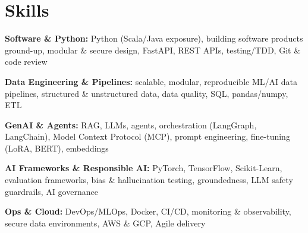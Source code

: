 \documentclass[10pt,a4paper]{article}
\begin{document}
\section{Skills}
\begin{tight}
  \item[\textcolor{accent}{\small$\bullet$}] \textbf{Software \& Python:} Python (Scala/Java exposure), building software products ground-up, modular \& secure design, FastAPI, REST APIs, testing/TDD, Git \& code review
  \item[\textcolor{accent}{\small$\bullet$}] \textbf{Data Engineering \& Pipelines:} scalable, modular, reproducible ML/AI data pipelines, structured \& unstructured data, data quality, SQL, pandas/numpy, ETL
  \item[\textcolor{accent}{\small$\bullet$}] \textbf{GenAI \& Agents:} RAG, LLMs, agents, orchestration (LangGraph, LangChain), Model Context Protocol (MCP), prompt engineering, fine-tuning (LoRA, BERT), embeddings
  \item[\textcolor{accent}{\small$\bullet$}] \textbf{AI Frameworks \& Responsible AI:} PyTorch, TensorFlow, Scikit-Learn, evaluation frameworks, bias \& hallucination testing, groundedness, LLM safety guardrails, AI governance
  \item[\textcolor{accent}{\small$\bullet$}] \textbf{Ops \& Cloud:} DevOps/MLOps, Docker, CI/CD, monitoring \& observability, secure data environments, AWS \& GCP, Agile delivery
\end{tight}

\end{document}
